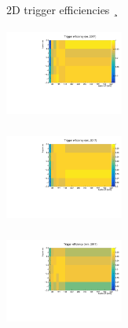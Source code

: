 \documentclass[8pt]{beamer}
\begin{document}
\begin{frame}{2D trigger efficiencies}
\vspace{-10pt}¸
\begin{minipage}[b]{.32\textwidth}
\begin{center}
\includegraphics[width=3.9cm, height=3cm]{figs/triggEff_2017_ee.pdf}
\end{center}
\end{minipage} \hfill
\begin{minipage}[b]{.32\textwidth}
\begin{center}
\includegraphics[width=3.9cm, height=3cm]{figs/triggEff_2017_em.pdf}
\end{center}
\end{minipage} \hfill
\begin{minipage}[b]{.32\textwidth}
\begin{center}
\includegraphics[width=3.9cm, height=3cm]{figs/triggEff_2017_mm.pdf}
\end{center}
\end{minipage} \vfill


\end{frame}
\end{document}
